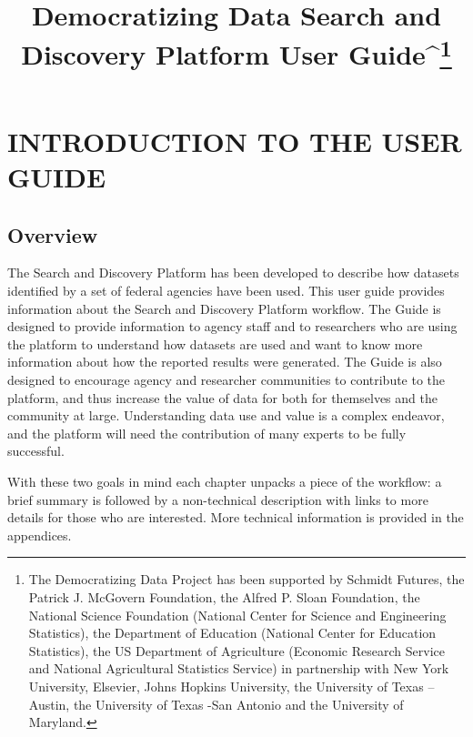 \documentclass[titlepage, 11pt]{article}
\title{{\fontfamily{qtm}\selectfont
\Huge{Democratizing Data Search and Discovery Platform User Guide}^\large{\footnote{The Democratizing Data Project has been supported by Schmidt Futures, the Patrick J. McGovern Foundation, the Alfred P. Sloan Foundation, the National Science Foundation (National Center for Science and Engineering Statistics), the Department of Education (National Center for Education Statistics), the US Department of Agriculture (Economic Research Service and National Agricultural Statistics Service) in partnership with New York University, Elsevier, Johns Hopkins University, the University of Texas – Austin, the University of Texas -San Antonio and the University of Maryland. }}
} }
\begin{document}
\maketitle
\tableofcontents

\newpage

\section{INTRODUCTION TO THE USER GUIDE} 
\subsection{Overview}
The Search and Discovery Platform has been developed to describe how datasets identified by a set of federal agencies have been used. This user guide provides information about the Search and Discovery Platform workflow.  The Guide is designed to provide information to agency staff and to researchers who are using the platform to understand how datasets are used and want to know more information about how the reported results were generated. The Guide is also designed to encourage agency and researcher communities to contribute to the platform, and thus increase the value of data for both for themselves and the community at large. Understanding data use and value is a complex endeavor, and the platform will need the contribution of many experts to be fully successful.

With these two goals in mind each chapter unpacks a piece of the workflow: a brief summary is followed by a non-technical description with links to more details for those who are interested.  More technical information is provided in the appendices. 
\end{document}
